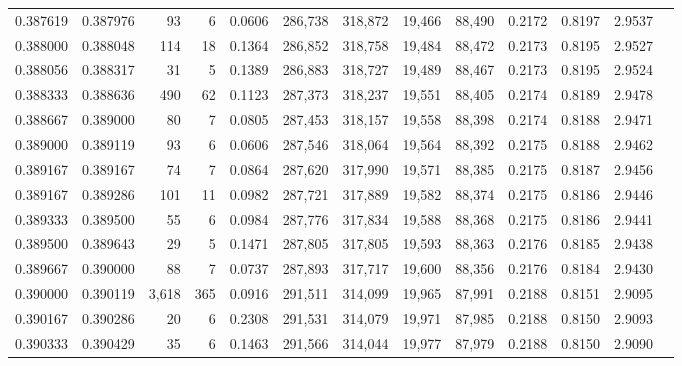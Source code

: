 \begin{tabular}{rrrrrrrrrrrrr}
0.387619 & 0.387976 &    93 &   6 &                                     0.0606 & 286,738 & 318,872 &  19,466 &  88,490 & 0.2172 & 0.8197 & 2.9537 \\
0.388000 & 0.388048 &   114 &  18 &                                     0.1364 & 286,852 & 318,758 &  19,484 &  88,472 & 0.2173 & 0.8195 & 2.9527 \\
0.388056 & 0.388317 &    31 &   5 &                                     0.1389 & 286,883 & 318,727 &  19,489 &  88,467 & 0.2173 & 0.8195 & 2.9524 \\
0.388333 & 0.388636 &   490 &  62 &                                     0.1123 & 287,373 & 318,237 &  19,551 &  88,405 & 0.2174 & 0.8189 & 2.9478 \\
0.388667 & 0.389000 &    80 &   7 &                                     0.0805 & 287,453 & 318,157 &  19,558 &  88,398 & 0.2174 & 0.8188 & 2.9471 \\
0.389000 & 0.389119 &    93 &   6 &                                     0.0606 & 287,546 & 318,064 &  19,564 &  88,392 & 0.2175 & 0.8188 & 2.9462 \\
0.389167 & 0.389167 &    74 &   7 &                                     0.0864 & 287,620 & 317,990 &  19,571 &  88,385 & 0.2175 & 0.8187 & 2.9456 \\
0.389167 & 0.389286 &   101 &  11 &                                     0.0982 & 287,721 & 317,889 &  19,582 &  88,374 & 0.2175 & 0.8186 & 2.9446 \\
0.389333 & 0.389500 &    55 &   6 &                                     0.0984 & 287,776 & 317,834 &  19,588 &  88,368 & 0.2175 & 0.8186 & 2.9441 \\
0.389500 & 0.389643 &    29 &   5 &                                     0.1471 & 287,805 & 317,805 &  19,593 &  88,363 & 0.2176 & 0.8185 & 2.9438 \\
0.389667 & 0.390000 &    88 &   7 &                                     0.0737 & 287,893 & 317,717 &  19,600 &  88,356 & 0.2176 & 0.8184 & 2.9430 \\
0.390000 & 0.390119 & 3,618 & 365 &                                     0.0916 & 291,511 & 314,099 &  19,965 &  87,991 & 0.2188 & 0.8151 & 2.9095 \\
0.390167 & 0.390286 &    20 &   6 &                                     0.2308 & 291,531 & 314,079 &  19,971 &  87,985 & 0.2188 & 0.8150 & 2.9093 \\
0.390333 & 0.390429 &    35 &   6 &                                     0.1463 & 291,566 & 314,044 &  19,977 &  87,979 & 0.2188 & 0.8150 & 2.9090 \\

\end{tabular}

